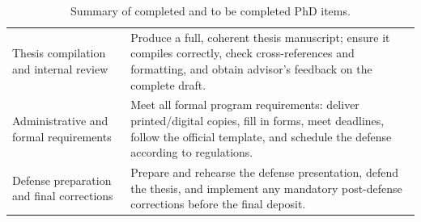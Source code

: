 ﻿\documentclass[../../ppgc-prop-tese.tex]{subfiles}
\begin{document}
\begin{table}[ht]
\begin{tabular}{p{}p{}}
Thesis compilation and internal review &
Produce a full, coherent thesis manuscript; ensure it compiles correctly, check cross-references and formatting, and obtain advisor's feedback on the complete draft. \\

Administrative and formal requirements &
Meet all formal program requirements: deliver printed/digital copies, fill in forms, meet deadlines, follow the official template, and schedule the defense according to regulations. \\

Defense preparation and final corrections &
Prepare and rehearse the defense presentation, defend the thesis, and implement any mandatory post-defense corrections before the final deposit. \\
\hline
\end{tabular}
\caption{Summary of completed and to be completed PhD items.}
\end{table}
\end{document}

